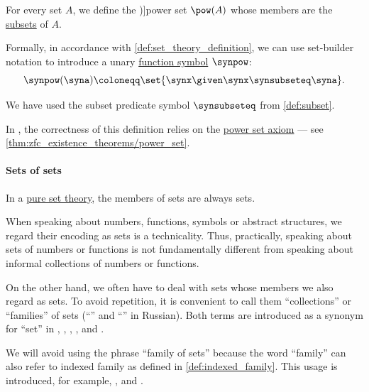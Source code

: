 \begin{definition}\label{def:power_set}
  For every set \( A \), we define the \term[ru=булеан (\cite[34]{БелоусовТкачёв2004ДискретнаяМатематика})]{power set} \( \pow(A) \) whose members are the \hyperref[def:subset]{subsets} of \( A \).

  Formally, in accordance with \cref{def:set_theory_definition}, we can use set-builder notation to introduce a unary \hyperref[def:fol_signature/function]{function symbol} \( {\synpow} \):
  \begin{equation*}
    \synpow(\syna) \coloneqq \set{ \synx \given \synx \synsubseteq \syna }.
  \end{equation*}

  We have used the subset predicate symbol \( {\synsubseteq} \) from \cref{def:subset}.
\end{definition}
\begin{comments}
  \item In \hyperref[def:zfc]{}, the correctness of this definition relies on the \hyperref[def:zfc/power_set]{power set axiom} --- see \cref{thm:zfc_existence_theorems/power_set}.
\end{comments}

\paragraph{Sets of sets}

\begin{remark}\label{rem:sets_of_sets}
  In a \hyperref[def:axiomatic_set_theory/atoms]{pure set theory}, the members of sets are always sets.

  When speaking about numbers, functions, symbols or abstract structures, we regard their encoding as sets is a technicality. Thus, practically, speaking about sets of numbers or functions is not fundamentally different from speaking about informal collections of numbers or functions.

  On the other hand, we often have to deal with sets whose members we also regard as sets. To avoid repetition, it is convenient to call them \enquote{collections} or \enquote{families} of sets (\enquote{} and \enquote{} in Russian). Both terms are introduced as a synonym for \enquote{set} in
  \cite[12]{Jech2006SetTheory},
  \cite[1]{Kelley1975GeneralTopology},
  \cite[1]{Willard2004GeneralTopology},
  \cite[27]{Rudin1976AnalysisPrinciples},
  \cite[2]{Folland1999RealAnalysis} and
  \cite[5]{Зорич2019АнализЧасть1}.

  We will avoid using the phrase \enquote{family of sets} because the word \enquote{family} can also refer to indexed family as defined in \cref{def:indexed_family}. This usage is introduced, for example,
  \cite[44]{Halmos1960NaiveSetTheory},
  \cite[81]{Bourbaki2004TheoryOfSets} and
  \cite[3]{Harzheim2005OrderedSets}.
\end{remark}

